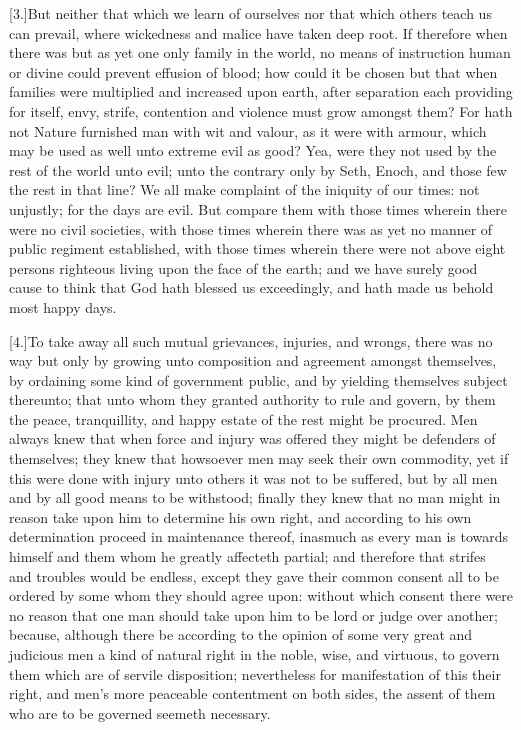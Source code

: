 [3.]But neither that which we learn of ourselves nor that which others teach us can prevail, where wickedness and malice have taken deep root. If therefore when there was but as yet one only family in the world, no means of instruction human or divine could prevent effusion of blood; how could it be chosen but that when families were multiplied and increased upon earth, after separation each providing for itself, envy, strife, contention and violence must grow amongst them? For hath not Nature furnished man with wit and valour, as it were with armour, which may be used as well unto extreme evil as good? Yea, were they not used by the rest of the world unto evil; unto the contrary only by Seth, Enoch, and those few the rest in that line? We all make complaint of the iniquity of our times: not unjustly; for the days are evil. But compare them with those times wherein there were no civil societies, with those times wherein there was as yet no manner of public regiment established, with those times wherein there were not above eight persons righteous living upon the face of the earth; and we have surely good cause to think that God hath blessed us exceedingly, and hath made us behold most happy days.

[4.]To take away all such mutual grievances, injuries, and wrongs, there was no way but only by growing unto composition  and agreement amongst themselves, by ordaining some kind of government public, and by yielding themselves subject thereunto; that unto whom they granted authority to rule and govern, by them the peace, tranquillity, and happy estate of the rest might be procured. Men always knew that when force and injury was offered they might be defenders of themselves; they knew that howsoever men may seek their own commodity, yet if this were done with injury unto others it was not to be suffered, but by all men and by all good means to be withstood; finally they knew that no man might in reason take upon him to determine his own right, and according to his own determination proceed in maintenance thereof, inasmuch as every man is towards himself and them whom he greatly affecteth partial; and therefore that strifes and troubles would be endless, except they gave their common consent all to be ordered by some whom they should agree upon: without which consent there were no reason that one man should take upon him to be lord or judge over another; because, although there be according to the opinion of some very great and judicious men a kind of natural right in the noble, wise, and virtuous, to govern them which are of servile disposition; nevertheless for manifestation of this their right, and men’s more peaceable contentment on both sides, the assent of them who are to be governed seemeth necessary.


